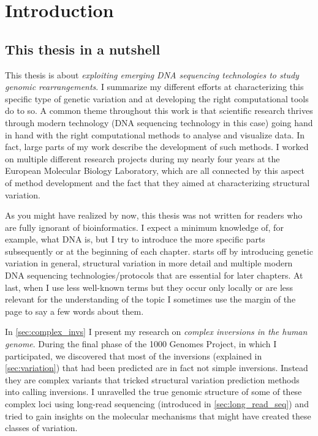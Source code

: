 \chapter{Introduction}
\label{sec:intro}


\section{This thesis in a nutshell}
This thesis is about \emph{exploiting emerging DNA sequencing technologies to
study genomic rearrangements}. I summarize my different efforts at
characterizing this specific type of genetic variation and at developing the
right computational tools do to so. A common theme throughout this work is that
scientific research thrives through modern technology (DNA sequencing technology
in this case) going hand in hand with the right computational methods to analyse
and visualize data. In fact, large parts of my work describe the development of
such methods. I worked on multiple different research projects during my nearly
four years at the European Molecular Biology Laboratory, which are all connected
by this aspect of method development and the fact that they aimed at
characterizing structural variation.

As you might have realized by now, this
thesis was not written for readers who are fully ignorant of bioinformatics. I
expect a minimum knowledge of, for example, what DNA is, but I try to introduce
the more specific parts subsequently or at the beginning of each chapter.
 starts off by introducing genetic variation in general,
structural variation in more detail and multiple modern DNA sequencing
technologies/protocols that are essential for later chapters. At last, when I
use less well-known terms but they occur only locally or are less relevant for
the understanding of the topic I sometimes use the margin of the page to say a
few words about them.

In \cref{sec:complex_invs} I present my research on \emph{complex inversions in
the human genome}. During the final phase of the 1000 Genomes Project, in which
I participated, we discovered that most of the inversions (explained in
\cref{sec:variation}) that had been predicted are in fact not simple inversions.
Instead they are complex variants that tricked structural variation prediction
methods into calling inversions. I unravelled the true genomic structure of some
of these complex loci using long-read sequencing (introduced in
\cref{sec:long_read_seq}) and tried to gain insights on the molecular
mechanisms that might have created these classes of variation.

